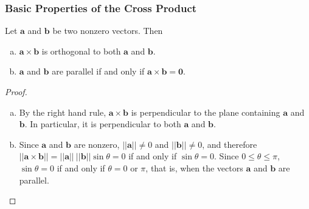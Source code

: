 \documentclass[12pt,letterpaper,reqno]{article}
\numberwithin{equation}{section}
\begin{document}
\subsubsection{Basic Properties of the Cross Product}

\begin{prop}\label{prop:geometry_of_the_cross_product}
Let $\mathbf{a}$ and $\mathbf{b}$ be two nonzero vectors. Then
	\begin{enumerate}[(a)]
		\item $\mathbf{a} \times \mathbf{b}$ is orthogonal to both $\mathbf{a}$ and $\mathbf{b}$.
		\item $\mathbf{a}$ and $\mathbf{b}$ are parallel if and only if $\mathbf{a} \times \mathbf{b}=\mathbf{0}$.
		\end{enumerate}
\end{prop}

\begin{proof}
\begin{enumerate}[(a)]
	\item By the right hand rule, $\mathbf{a} \times \mathbf{b}$ is perpendicular to the plane containing $\mathbf{a}$ and $\mathbf{b}$. In particular, it is perpendicular to both $\mathbf{a}$ and $\mathbf{b}$.
	\item Since $\mathbf{a}$ and $\mathbf{b}$ are nonzero, $||\mathbf{a}||\neq 0$ and $||\mathbf{b}|| \neq 0$, and therefore $||\mathbf{a} \times \mathbf{b}||=||\mathbf{a}|| \ ||\mathbf{b}||\sin\theta=0$ if and only if $\sin \theta=0$. Since $0 \leq \theta \leq \pi$, $\sin \theta=0$ if and only if $\theta=0$ or $\pi$, that is, when the vectors $\mathbf{a}$ and $\mathbf{b}$ are parallel.
\end{enumerate}	
\end{proof}
\end{document}
